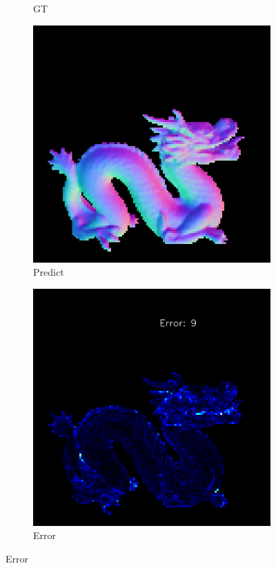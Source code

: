 \begin{figure}[H]
\begin{subfigure}[b]{0.24\linewidth}
		\caption{GT}
	\end{subfigure}
	\begin{subfigure}[b]{0.24\linewidth}
		\includegraphics[width=\linewidth]{./Figures/gcnn_synthetic/fancy_eval_7_normal_GCNN-GCNN.png}
		\caption{Predict}
	\end{subfigure}
	\begin{subfigure}[b]{0.24\linewidth}
		\includegraphics[width=\linewidth]{./Figures/gcnn_synthetic/fancy_eval_7_error_GCNN-GCNN.png}
		\caption{Error}
	\end{subfigure}
	

\end{figure}
